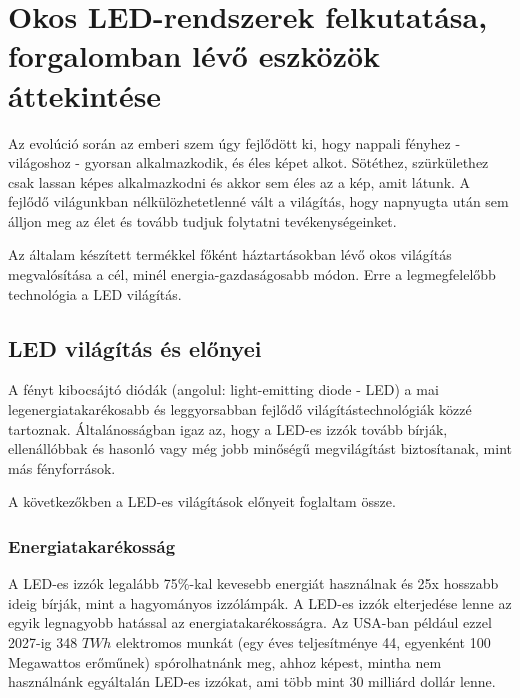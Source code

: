\documentclass[../main.tex]{subfiles}
\begin{document}
\section{Okos LED-rendszerek felkutatása, forgalomban lévő eszközök áttekintése}
    Az evolúció során az emberi szem úgy fejlődött ki, hogy nappali fényhez - világoshoz - gyorsan alkalmazkodik, és éles képet alkot. Sötéthez, szürkülethez csak lassan képes alkalmazkodni és akkor sem éles az a kép, amit látunk. A fejlődő világunkban nélkülözhetetlenné vált a világítás, hogy napnyugta után sem álljon meg az élet és tovább tudjuk folytatni tevékenységeinket.

    
    
    Az általam készített termékkel főként háztartásokban lévő okos világítás megvalósítása a cél, minél energia-gazdaságosabb módon. Erre a legmegfelelőbb technológia a LED világítás\cite{a_energy_efficien_smart_led_systems}.
    
    \subsection{LED világítás és előnyei} 
    A fényt kibocsájtó diódák (angolul: light-emitting diode - LED) a mai legenergiatakarékosabb és leggyorsabban fejlődő világítástechnológiák közzé tartoznak. Általánosságban igaz az, hogy a LED-es izzók tovább bírják, ellenállóbbak és hasonló vagy még jobb minőségű megvilágítást biztosítanak, mint más fényforrások. \citep{led_lighting} 
    
    
    A következőkben a LED-es világítások előnyeit foglaltam össze.
        \subsubsection{Energiatakarékosság} 
            A LED-es izzók legalább 75\%-kal kevesebb energiát használnak és 25x hosszabb ideig bírják, mint a hagyományos izzólámpák. A LED-es izzók elterjedése lenne az egyik legnagyobb hatással az energiatakarékosságra. Az USA-ban például ezzel 2027-ig 348 $TWh$ elektromos munkát (egy éves teljesítménye 44, egyenként 100 Megawattos erőműnek) spórolhatnánk meg, ahhoz képest, mintha nem használnánk egyáltalán LED-es izzókat, ami több mint 30 milliárd dollár lenne.
            
\end{document}
